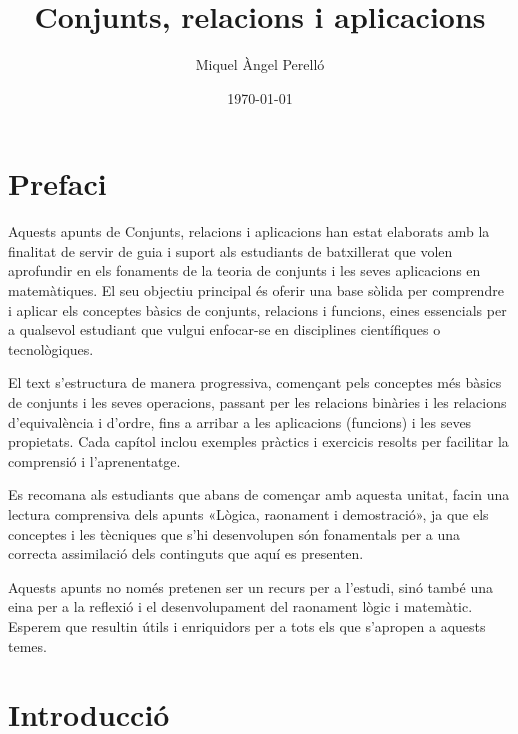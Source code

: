 \documentclass[12pt,a4paper,oneside]{book}
\begin{document}
\pagecolor{fons!20}

\frontmatter
\title{Conjunts, relacions i aplicacions}
\author{Miquel Àngel Perelló}
\date{\today}
\maketitle
\tableofcontents


\let\cleardoublepage\clearpage

\chapter*{Prefaci}

Aquests apunts de Conjunts, relacions i aplicacions han estat elaborats amb la finalitat de servir de guia i suport als estudiants de batxillerat que volen aprofundir en els fonaments de la teoria de conjunts i les seves aplicacions en matemàtiques. El seu objectiu principal és oferir una base sòlida per comprendre i aplicar els conceptes bàsics de conjunts, relacions i funcions, eines essencials per a qualsevol estudiant que vulgui enfocar-se en disciplines científiques o tecnològiques.

\bigskip

El text s’estructura de manera progressiva, començant pels conceptes més bàsics de conjunts i les seves operacions, passant per les relacions binàries i les relacions d’equivalència i d’ordre, fins a arribar a les aplicacions (funcions) i les seves propietats. Cada capítol inclou exemples pràctics i exercicis resolts per facilitar la comprensió i l’aprenentatge.

\bigskip

Es recomana als estudiants que abans de començar amb aquesta unitat, facin una lectura comprensiva dels apunts «Lògica, raonament i demostració», ja que els conceptes i les tècniques que s’hi desenvolupen són fonamentals per a una correcta assimilació dels continguts que aquí es presenten.

\bigskip

Aquests apunts no només pretenen ser un recurs per a l’estudi, sinó també una eina per a la reflexió i el desenvolupament del raonament lògic i matemàtic. Esperem que resultin útils i enriquidors per a tots els que s’apropen a aquests temes.

\let\cleardoublepage\clearpage

\chapter{Introducció}
\end{document}
